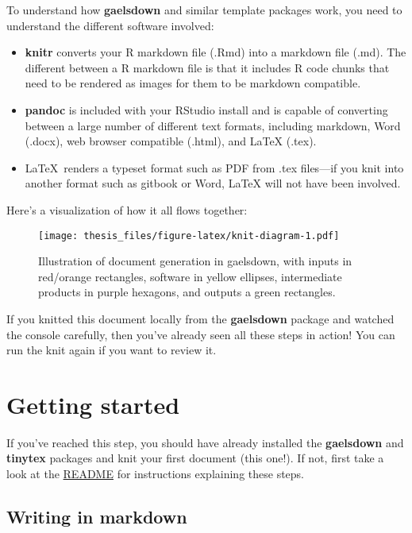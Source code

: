 \documentclass[12pt, oneside]{queensuthesis}
\numberwithin{equation}{chapter}       %
\providecommand{\tightlist}{%
  \setlength{\itemsep}{0pt}\setlength{\parskip}{0pt}}
\begin{document}
To understand how \textbf{gaelsdown} and similar template packages work, you need to understand the different software involved:
\begin{itemize}
\tightlist
\item
  \textbf{knitr} converts your R markdown file (.Rmd) into a markdown file (.md). The different between a R markdown file is that it includes R code chunks that need to be rendered as images for them to be markdown compatible.
\item
  \textbf{pandoc} is included with your RStudio install and is capable of converting between a large number of different text formats, including markdown, Word (.docx), web browser compatible (.html), and LaTeX (.tex).
\item
  \LaTeX~renders a typeset format such as PDF from .tex files---if you knit into another format such as gitbook or Word, LaTeX will not have been involved.
\end{itemize}
Here's a visualization of how it all flows together:
\begin{figure}
\centering
\texttt{[image: thesis\_files/figure-latex/knit-diagram-1.pdf]}
\caption{\label{fig:knit-diagram}Illustration of document generation in gaelsdown, with inputs in red/orange rectangles, software in yellow ellipses, intermediate products in purple hexagons, and outputs a green rectangles.}
\end{figure}
If you knitted this document locally from the \textbf{gaelsdown} package and watched the console carefully, then you've already seen all these steps in action! You can run the knit again if you want to review it.

\hypertarget{getting-started}{%
\chapter{Getting started}\label{getting-started}}

If you've reached this step, you should have already installed the \textbf{gaelsdown} and \textbf{tinytex} packages and knit your first document (this one!). If not, first take a look at the \href{https://github.com/eugenesit/gaelsdown\#readme}{README} for instructions explaining these steps.

\hypertarget{writing-in-markdown}{%
\section{Writing in markdown}\label{writing-in-markdown}}
\end{document}
